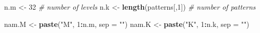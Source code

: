 \documentclass[
]{article}
\newenvironment{Shaded}{\begin{snugshade}}{\end{snugshade}}
\newcommand{\CommentTok}[1]{\textcolor[rgb]{0.56,0.35,0.01}{\textit{#1}}}
\newcommand{\DataTypeTok}[1]{\textcolor[rgb]{0.13,0.29,0.53}{#1}}
\newcommand{\DecValTok}[1]{\textcolor[rgb]{0.00,0.00,0.81}{#1}}
\newcommand{\KeywordTok}[1]{\textcolor[rgb]{0.13,0.29,0.53}{\textbf{#1}}}
\newcommand{\NormalTok}[1]{#1}
\newcommand{\OperatorTok}[1]{\textcolor[rgb]{0.81,0.36,0.00}{\textbf{#1}}}
\newcommand{\StringTok}[1]{\textcolor[rgb]{0.31,0.60,0.02}{#1}}
\begin{document}
\begin{Shaded}
\begin{Highlighting}[]
\NormalTok{n.m <-}\StringTok{ }\DecValTok{32}                      \CommentTok{# number of levels}
\NormalTok{n.k <-}\StringTok{ }\KeywordTok{length}\NormalTok{(patterns[,}\DecValTok{1}\NormalTok{])    }\CommentTok{# number of patterns}

\NormalTok{nam.M <-}\StringTok{ }\KeywordTok{paste}\NormalTok{(}\StringTok{"M"}\NormalTok{, }\DecValTok{1}\OperatorTok{:}\NormalTok{n.m, }\DataTypeTok{sep =} \StringTok{""}\NormalTok{)}
\NormalTok{nam.K <-}\StringTok{ }\KeywordTok{paste}\NormalTok{(}\StringTok{"K"}\NormalTok{, }\DecValTok{1}\OperatorTok{:}\NormalTok{n.k, }\DataTypeTok{sep =} \StringTok{""}\NormalTok{)}
\end{Highlighting}
\end{Shaded}
\end{document}
